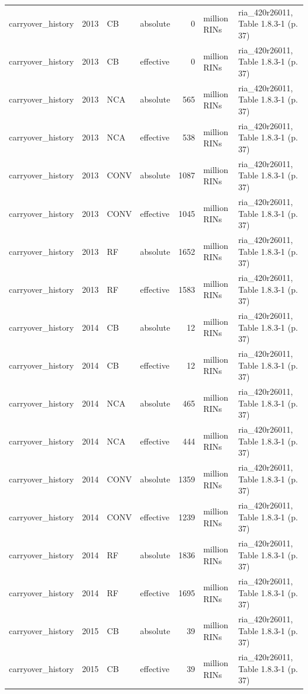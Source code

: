 \begin{longtable}{p{2.3cm}p{0.7cm}p{1.0cm}p{2.6cm}rp{1.7cm}p{4.6cm}}
carryover\_history & 2013 & CB & absolute & 0 & million RINs & ria\_420r26011, Table 1.8.3-1 (p. 37) \\
carryover\_history & 2013 & CB & effective & 0 & million RINs & ria\_420r26011, Table 1.8.3-1 (p. 37) \\
carryover\_history & 2013 & NCA & absolute & 565 & million RINs & ria\_420r26011, Table 1.8.3-1 (p. 37) \\
carryover\_history & 2013 & NCA & effective & 538 & million RINs & ria\_420r26011, Table 1.8.3-1 (p. 37) \\
carryover\_history & 2013 & CONV & absolute & 1087 & million RINs & ria\_420r26011, Table 1.8.3-1 (p. 37) \\
carryover\_history & 2013 & CONV & effective & 1045 & million RINs & ria\_420r26011, Table 1.8.3-1 (p. 37) \\
carryover\_history & 2013 & RF & absolute & 1652 & million RINs & ria\_420r26011, Table 1.8.3-1 (p. 37) \\
carryover\_history & 2013 & RF & effective & 1583 & million RINs & ria\_420r26011, Table 1.8.3-1 (p. 37) \\
carryover\_history & 2014 & CB & absolute & 12 & million RINs & ria\_420r26011, Table 1.8.3-1 (p. 37) \\
carryover\_history & 2014 & CB & effective & 12 & million RINs & ria\_420r26011, Table 1.8.3-1 (p. 37) \\
carryover\_history & 2014 & NCA & absolute & 465 & million RINs & ria\_420r26011, Table 1.8.3-1 (p. 37) \\
carryover\_history & 2014 & NCA & effective & 444 & million RINs & ria\_420r26011, Table 1.8.3-1 (p. 37) \\
carryover\_history & 2014 & CONV & absolute & 1359 & million RINs & ria\_420r26011, Table 1.8.3-1 (p. 37) \\
carryover\_history & 2014 & CONV & effective & 1239 & million RINs & ria\_420r26011, Table 1.8.3-1 (p. 37) \\
carryover\_history & 2014 & RF & absolute & 1836 & million RINs & ria\_420r26011, Table 1.8.3-1 (p. 37) \\
carryover\_history & 2014 & RF & effective & 1695 & million RINs & ria\_420r26011, Table 1.8.3-1 (p. 37) \\
carryover\_history & 2015 & CB & absolute & 39 & million RINs & ria\_420r26011, Table 1.8.3-1 (p. 37) \\
carryover\_history & 2015 & CB & effective & 39 & million RINs & ria\_420r26011, Table 1.8.3-1 (p. 37) \\

\end{longtable}
